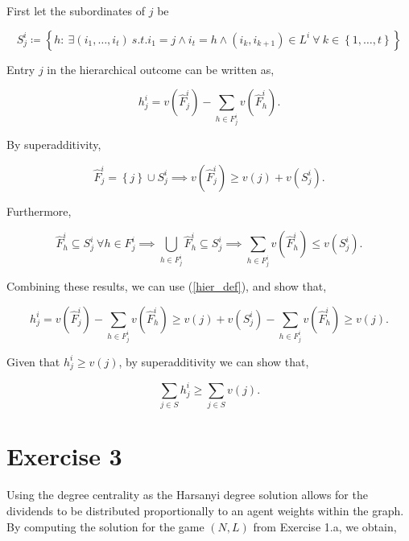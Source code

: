 \documentclass[american]{scrartcl}
\newcommand{\set}[1]{\left\{#1\right\}}
\begin{document}
First let the subordinates of $j$ be

\begin{equation}
    S^i_{j} \coloneqq \set{h: \ \exists (i_1, \dots, i_t) \ s.t. i_1 = j \land i_t = h \land (i_k, i_{k+1}) \in L^i \ \forall  \ k \in \set{1, \dots, t}}
\end{equation}

Entry $j$ in the hierarchical outcome can be written as,

\begin{equation} \label{hier_def}
    h^i_{j} = v(\hat{F}^i_j) - \sum_{h \in F^i_j}  v(\hat{F}^i_h).
\end{equation}

By superadditivity,

\begin{equation}
    \hat{F}^i_j = \set{j} \cup S^i_{j} \implies v(\hat{F}^i_j ) \geq v(j) + v(S^i_{j}).
\end{equation}

Furthermore,

\begin{equation}
    \hat{F}^i_h \subseteq S^i_{j} \ \forall h \in F^i_j \implies \bigcup_{h \in F^i_j} \hat{F}^i_h \subseteq S^i_{j} \implies \sum_{h \in F^i_j}  v(\hat{F}^i_h) \leq v(S^i_{j}).
\end{equation}

Combining these results, we can use (\ref{hier_def}), and show that,

\begin{equation}
    h^i_{j} = v(\hat{F}^i_j) - \sum_{h \in F^i_j}  v(\hat{F}^i_h) \geq v(j) + v(S^i_{j}) - \sum_{h \in F^i_j}  v(\hat{F}^i_h) \geq v(j).
\end{equation}

Given that $h^i_{j} \geq v(j)$, by superadditivity we can show that,

\begin{equation}
    \sum_{j \in S} h^i_{j} \geq \sum_{j \in S} v(j). %
\end{equation}

\section*{Exercise 3}

Using the degree centrality as the Harsanyi degree solution allows for the dividends to be distributed proportionally to an agent weights within the graph. By computing the solution for the game $(N, L)$ from Exercise 1.a, we obtain,
\end{document}
